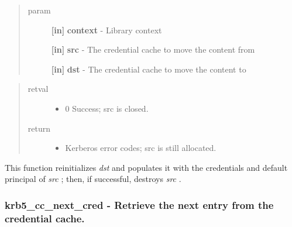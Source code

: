 \documentclass[letterpaper,10pt,english]{sphinxmanual}
\begin{document}
\begin{quote}\begin{description}
\item[{param}] \leavevmode
\textbf{{[}in{]}} \textbf{context} - Library context

\textbf{{[}in{]}} \textbf{src} - The credential cache to move the content from

\textbf{{[}in{]}} \textbf{dst} - The credential cache to move the content to

\end{description}\end{quote}
\begin{quote}\begin{description}
\item[{retval}] \leavevmode\begin{itemize}
\item {} 
0   Success; src is closed.

\end{itemize}

\item[{return}] \leavevmode\begin{itemize}
\item {} 
Kerberos error codes; src is still allocated.

\end{itemize}

\end{description}\end{quote}

This function reinitializes \emph{dst} and populates it with the credentials and default principal of \emph{src} ; then, if successful, destroys \emph{src} .


\subsubsection{krb5\_cc\_next\_cred -  Retrieve the next entry from the credential cache.}
\label{appdev/refs/api/krb5_cc_next_cred::doc}\label{appdev/refs/api/krb5_cc_next_cred:krb5-cc-next-cred-retrieve-the-next-entry-from-the-credential-cache}

\begin{fulllineitems}
\label{appdev/refs/api/krb5_cc_next_cred:krb5_cc_next_cred}
\end{fulllineitems}
\end{document}
